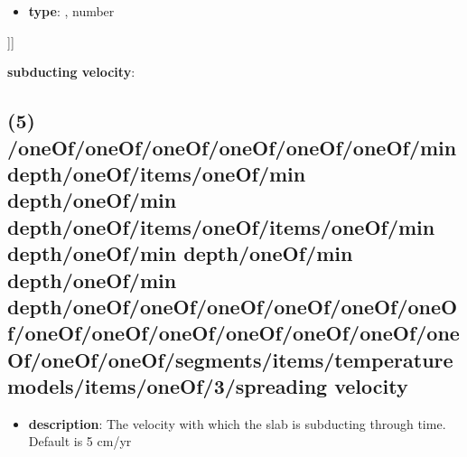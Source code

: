 \begin{itemize}[leftmargin=10em]\item {\bf type}: , number\end{itemize}]]\item {\bf subducting velocity}: \subsection{(5) /oneOf/oneOf/oneOf/oneOf/oneOf/oneOf/min depth/oneOf/items/oneOf/min depth/oneOf/min depth/oneOf/items/oneOf/items/oneOf/min depth/oneOf/min depth/oneOf/min depth/oneOf/min depth/oneOf/oneOf/oneOf/oneOf/oneOf/oneOf/oneOf/oneOf/oneOf/oneOf/oneOf/oneOf/oneOf/oneOf/oneOf/segments/items/temperature models/items/oneOf/3/spreading velocity}
\begin{itemize}[leftmargin=5em]\item {\bf description}: The velocity with which the slab is subducting through time. Default is 5 cm/yr
\end{itemize}
